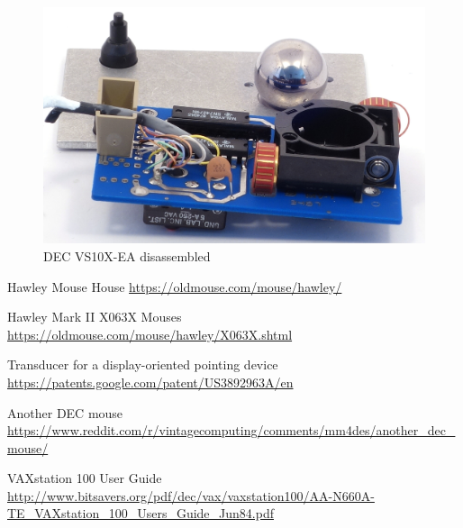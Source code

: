 \documentclass[11pt, a4paper]{article}
\begin{document}
\begin{figure}[h]
    \centering
    \includegraphics[scale=1]{1983_dec_vs10x_ea_mouse/inside_30.jpg}
    \caption{DEC VS10X-EA disassembled}
    \label{fig:DecVS10XInside}
\end{figure}

\begin{thebibliography}{9}
 Hawley Mouse House \url{https://oldmouse.com/mouse/hawley/}

 Hawley Mark II X063X Mouses \url{https://oldmouse.com/mouse/hawley/X063X.shtml}

 Transducer for a display-oriented pointing device \url{https://patents.google.com/patent/US3892963A/en}

 Another DEC mouse \url{https://www.reddit.com/r/vintagecomputing/comments/mm4des/another_dec_mouse/}

 VAXstation 100 User Guide \url{http://www.bitsavers.org/pdf/dec/vax/vaxstation100/AA-N660A-TE_VAXstation_100_Users_Guide_Jun84.pdf}
\end{thebibliography}
\end{document}
